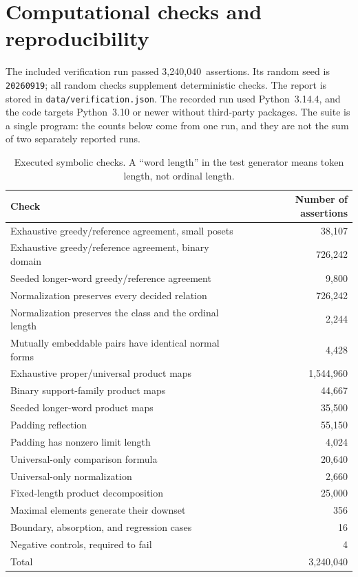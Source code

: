 \documentclass[11pt,a4paper]{article}
\numberwithin{equation}{section}
\theoremstyle{definition}
\theoremstyle{remark}
\newcommand{\TestAssertions}{3,240,040}
\begin{document}
\section{Computational checks and reproducibility}
\label{sec:tests}

The included verification run passed \TestAssertions\ assertions. Its
random seed is \texttt{20260919}; all random checks supplement deterministic
checks. The report is stored in \texttt{data/verification.json}. The
recorded run used Python~3.14.4, and the code targets Python~3.10 or newer
without third-party packages. The suite is a single program: the counts below
come from one run, and they are not the sum of two separately reported runs.

\begin{table}[htbp]
\centering
\begin{tabular}{@{}lr@{}}
\toprule
Check & Number of assertions\\
\midrule
Exhaustive greedy/reference agreement, small posets & 38,107\\
Exhaustive greedy/reference agreement, binary domain & 726,242\\
Seeded longer-word greedy/reference agreement & 9,800\\
Normalization preserves every decided relation & 726,242\\
Normalization preserves the class and the ordinal length & 2,244\\
Mutually embeddable pairs have identical normal forms & 4,428\\
Exhaustive proper/universal product maps & 1,544,960\\
Binary support-family product maps & 44,667\\
Seeded longer-word product maps & 35,500\\
Padding reflection & 55,150\\
Padding has nonzero limit length & 4,024\\
Universal-only comparison formula & 20,640\\
Universal-only normalization & 2,660\\
Fixed-length product decomposition & 25,000\\
Maximal elements generate their downset & 356\\
Boundary, absorption, and regression cases & 16\\
Negative controls, required to fail & 4\\
\midrule
Total & \TestAssertions\\
\bottomrule
\end{tabular}
\caption{Executed symbolic checks. A ``word length'' in the test generator
means token length, not ordinal length.}
\label{tab:checks}
\end{table}
\end{document}
